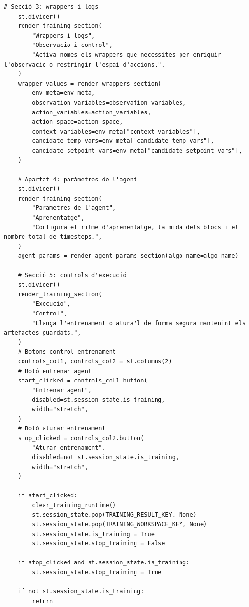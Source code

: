 \documentclass[10pt,a4paper]{article}
\begin{document}
\begin{lstlisting}[style=studioPython,caption={pages/Entrenar\_Agent.py},label={lst:pages-entrenar-agent-py}]
    # Secció 3: wrappers i logs
    st.divider()
    render_training_section(
        "Wrappers i logs",
        "Observacio i control",
        "Activa nomes els wrappers que necessites per enriquir l'observacio o restringir l'espai d'accions.",
    )
    wrapper_values = render_wrappers_section(
        env_meta=env_meta,
        observation_variables=observation_variables,
        action_variables=action_variables,
        action_space=action_space,
        context_variables=env_meta["context_variables"],
        candidate_temp_vars=env_meta["candidate_temp_vars"],
        candidate_setpoint_vars=env_meta["candidate_setpoint_vars"],
    )

    # Apartat 4: paràmetres de l'agent
    st.divider()
    render_training_section(
        "Parametres de l'agent",
        "Aprenentatge",
        "Configura el ritme d'aprenentatge, la mida dels blocs i el nombre total de timesteps.",
    )
    agent_params = render_agent_params_section(algo_name=algo_name)

    # Secció 5: controls d'execució
    st.divider()
    render_training_section(
        "Execucio",
        "Control",
        "Llança l'entrenament o atura'l de forma segura mantenint els artefactes guardats.",
    )
    # Botons control entrenament
    controls_col1, controls_col2 = st.columns(2)
    # Botó entrenar agent
    start_clicked = controls_col1.button(
        "Entrenar agent",
        disabled=st.session_state.is_training,
        width="stretch",
    )
    # Botó aturar entrenament
    stop_clicked = controls_col2.button(
        "Aturar entrenament",
        disabled=not st.session_state.is_training,
        width="stretch",
    )

    if start_clicked:
        clear_training_runtime()
        st.session_state.pop(TRAINING_RESULT_KEY, None)
        st.session_state.pop(TRAINING_WORKSPACE_KEY, None)
        st.session_state.is_training = True
        st.session_state.stop_training = False

    if stop_clicked and st.session_state.is_training:
        st.session_state.stop_training = True

    if not st.session_state.is_training:
        return


\end{lstlisting}
\end{document}
